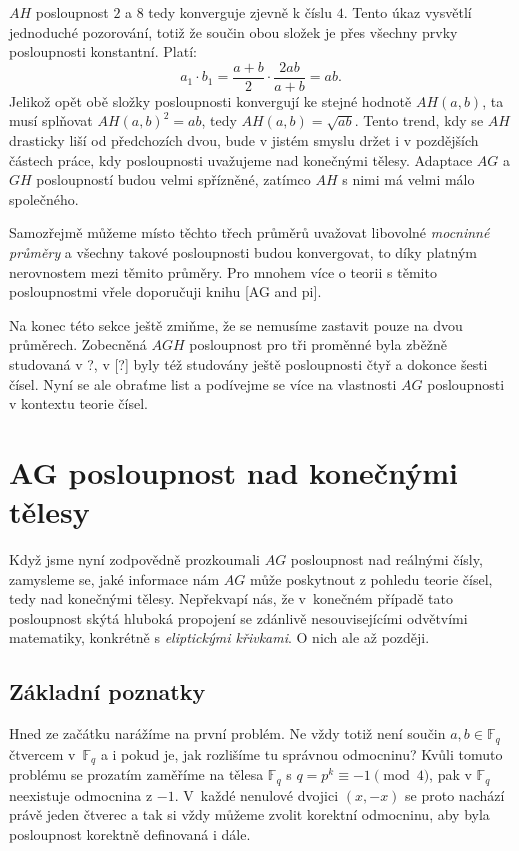 \documentclass[12pt]{report}
\begin{document}
$AH$ posloupnost $2$ a $8$ tedy konverguje zjevně k číslu $4$. Tento úkaz vysvětlí jednoduché pozorování, totiž že součin obou složek je přes všechny prvky posloupnosti konstantní. Platí:
$$a_1 \cdot b_1 = \frac{a+b}{2} \cdot \frac{2ab}{a+b} = ab.$$
Jelikož opět obě složky posloupnosti konvergují ke stejné hodnotě $AH(a,b)$, ta musí splňovat $AH (a,b)^2 = ab$, tedy $AH(a,b) = \sqrt{ab}$. Tento trend, kdy se $AH$ drasticky liší od předchozích dvou, bude v jistém smyslu držet i v pozdějších částech práce, kdy posloupnosti uvažujeme nad konečnými tělesy. Adaptace $AG$ a $GH$ posloupností budou velmi spřízněné, zatímco $AH$ s nimi má velmi málo společného.

Samozřejmě můžeme místo těchto třech průměrů uvažovat libovolné \textit{mocninné průměry} a všechny takové posloupnosti budou konvergovat, to díky platným nerovnostem mezi těmito průměry. Pro mnohem více o teorii s těmito posloupnostmi vřele doporučuji knihu [AG and pi].

Na konec této sekce ještě zmiňme, že se nemusíme zastavit pouze na dvou průměrech. Zobecněná $AGH$ posloupnost pro tři proměnné byla zběžně studovaná v ?, v [?] byly též studovány ještě posloupnosti čtyř a dokonce šesti čísel. Nyní se ale obraťme list a podívejme se více na vlastnosti $AG$ posloupnosti v kontextu teorie čísel. 



\chapter{AG posloupnost nad konečnými tělesy}

Když jsme nyní zodpovědně prozkoumali $AG$ posloupnost nad reálnými čísly, zamysleme se, jaké informace nám $AG$ může poskytnout z pohledu teorie čísel, tedy nad konečnými tělesy. Nepřekvapí nás, že v~konečném případě tato posloupnost skýtá hluboká propojení se zdánlivě nesouvisejícími odvětvími matematiky, konkrétně s \textit{eliptickými křivkami}. O nich ale až později.


\section{Základní poznatky}

Hned ze začátku narážíme na první problém. Ne vždy totiž není součin $a,b \in \mathbb{F}_q$ čtvercem v~$\mathbb{F}_q$ a i pokud je, jak rozlišíme tu správnou odmocninu? Kvůli tomuto problému se prozatím zaměříme na tělesa $\mathbb{F}_q$ s $q = p^k \equiv -1 \pmod{4}$, pak v $\mathbb{F}_q$ neexistuje odmocnina z $-1$. V~každé nenulové dvojici $(x,-x)$ se proto nachází právě jeden čtverec a tak si vždy můžeme zvolit korektní odmocninu, aby byla posloupnost korektně definovaná i dále.  
\end{document}
